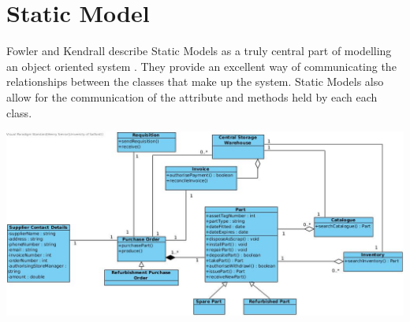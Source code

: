 \section{Static Model}
Fowler and Kendrall describe Static Models as a truly central part of modelling an object oriented system \cite{UML-Distilled}. They provide an excellent way of communicating the relationships between the classes that make up the system. Static Models also allow for the communication of the attribute and methods held by each each class.

\begin{center}
	\includegraphics[width=21.5cm, angle=90, origin=h]{images/static-model.jpg}
\end{center}